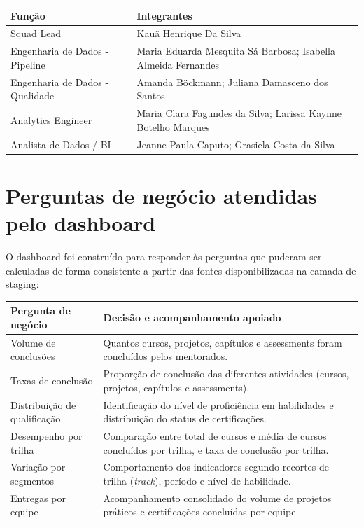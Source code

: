 \documentclass[11pt,a4paper]{article}
\begin{document}
\begin{tabularx}{\textwidth}{L{52mm}Y}
\toprule
\textbf{Função} & \textbf{Integrantes} \\
\midrule
Squad Lead & Kauã Henrique Da Silva \\
Engenharia de Dados - Pipeline & Maria Eduarda Mesquita Sá Barbosa; Isabella Almeida Fernandes \\
Engenharia de Dados - Qualidade & Amanda Böckmann; Juliana Damasceno dos Santos \\
Analytics Engineer & Maria Clara Fagundes da Silva; Larissa Kaynne Botelho Marques \\
Analista de Dados / BI & Jeanne Paula Caputo; Grasiela Costa da Silva \\
\bottomrule
\end{tabularx}

\section{Perguntas de negócio atendidas pelo dashboard}

O dashboard foi construído para responder às perguntas que puderam ser calculadas
de forma consistente a partir das fontes disponibilizadas na camada de staging:

\begin{longtable}{L{52mm}L{94mm}}
\toprule
\textbf{Pergunta de negócio} & \textbf{Decisão e acompanhamento apoiado} \\
\midrule
\endhead
Volume de conclusões & Quantos cursos, projetos, capítulos e assessments foram concluídos pelos mentorados. \\
Taxas de conclusão & Proporção de conclusão das diferentes atividades (cursos, projetos, capítulos e assessments). \\
Distribuição de qualificação & Identificação do nível de proficiência em habilidades e distribuição do status de certificações. \\
Desempenho por trilha & Comparação entre total de cursos e média de cursos concluídos por trilha, e taxa de conclusão por trilha. \\
Variação por segmentos & Comportamento dos indicadores segundo recortes de trilha (\textit{track}), período e nível de habilidade. \\
Entregas por equipe & Acompanhamento consolidado do volume de projetos práticos e certificações concluídas por equipe. \\
\bottomrule
\end{longtable}
\end{document}

